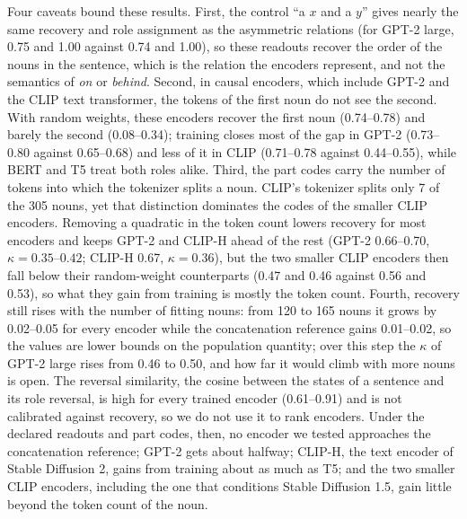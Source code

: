 \documentclass[10pt]{article}
\theoremstyle{plain}
\theoremstyle{remark}
\begin{document}
Four caveats bound these results. First, the control ``a $x$ and a $y$'' gives nearly the same recovery and role assignment as the asymmetric relations (for GPT-2 large, 0.75 and 1.00 against 0.74 and 1.00), so these readouts recover the order of the nouns in the sentence, which is the relation the encoders represent, and not the semantics of \emph{on} or \emph{behind}. Second, in causal encoders, which include GPT-2 and the CLIP text transformer, the tokens of the first noun do not see the second. With random weights, these encoders recover the first noun (0.74--0.78) and barely the second (0.08--0.34); training closes most of the gap in GPT-2 (0.73--0.80 against 0.65--0.68) and less of it in CLIP (0.71--0.78 against 0.44--0.55), while BERT and T5 treat both roles alike. Third, the part codes carry the number of tokens into which the tokenizer splits a noun. CLIP's tokenizer splits only 7 of the 305 nouns, yet that distinction dominates the codes of the smaller CLIP encoders. Removing a quadratic in the token count lowers recovery for most encoders and keeps GPT-2 and CLIP-H ahead of the rest (GPT-2 0.66--0.70, $\kappa = 0.35$--$0.42$; CLIP-H 0.67, $\kappa = 0.36$), but the two smaller CLIP encoders then fall below their random-weight counterparts (0.47 and 0.46 against 0.56 and 0.53), so what they gain from training is mostly the token count. Fourth, recovery still rises with the number of fitting nouns: from 120 to 165 nouns it grows by 0.02--0.05 for every encoder while the concatenation reference gains 0.01--0.02, so the values are lower bounds on the population quantity; over this step the $\kappa$ of GPT-2 large rises from 0.46 to 0.50, and how far it would climb with more nouns is open. The reversal similarity, the cosine between the states of a sentence and its role reversal, is high for every trained encoder (0.61--0.91) and is not calibrated against recovery, so we do not use it to rank encoders. Under the declared readouts and part codes, then, no encoder we tested approaches the concatenation reference; GPT-2 gets about halfway; CLIP-H, the text encoder of Stable Diffusion 2, gains from training about as much as T5; and the two smaller CLIP encoders, including the one that conditions Stable Diffusion 1.5, gain little beyond the token count of the noun.
\end{document}
